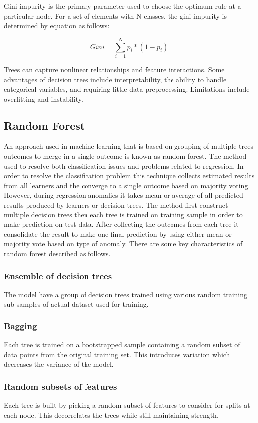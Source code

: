 \documentclass[12pt, a4paper, twoside]{report}
\theoremstyle{plain} %
\theoremstyle{definition} %
\theoremstyle{remark} %
\numberwithin{equation}{chapter}
\begin{document}
Gini impurity is the primary parameter used to choose the optimum rule at a particular node. For a set of elements with N classes, the gini impurity is determined by equation as follows:

\begin{equation}
Gini = \sum_{i=1}^{N} p_i * (1 - p_i)
\end{equation}

Trees can capture nonlinear relationships and feature interactions. Some advantages of decision trees include interpretability, the ability to handle categorical variables, and requiring little data preprocessing. Limitations include overfitting and instability.
\subsection{Random Forest}
An approach used in machine learning that is based on grouping of multiple trees outcomes to merge in a single outcome  is known as random forest. The method used to resolve both classification issues and problems related to regression. In order to resolve the classification problem this technique collects estimated results from all learners and the converge to a single outcome based on majority voting. However, during regression anomalies it takes mean or average of all predicted results produced by learners or decision trees. The method first construct multiple decision trees then each tree is trained on training sample in order to make prediction on test data. After collecting the outcomes from each tree it consolidate the result to make one final prediction by using either mean or majority vote based on type of anomaly. There are some key characteristics of random forest described as follows.

\subsubsection{Ensemble of decision trees} The model have a group of decision trees trained using various random training sub samples of actual dataset used 
 for training.
\subsubsection{Bagging} Each tree is trained on a bootstrapped sample containing a random subset of data points from the original training set. This introduces variation which decreases the variance of the model.
\subsubsection{Random subsets of features} Each tree is built by picking a random subset of features to consider for splits at each node. This decorrelates the trees while still maintaining strength.
\end{document}
